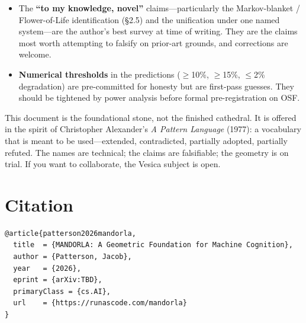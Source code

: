 \documentclass[11pt,a4paper]{article}
\begin{document}
\begin{itemize}[leftmargin=*]
  \item The \textbf{``to my knowledge, novel''} claims---particularly the Markov-blanket / Flower-of-Life identification (\S 2.5) and the unification under one named system---are the author's best survey at time of writing. They are the claims most worth attempting to falsify on prior-art grounds, and corrections are welcome.
  \item \textbf{Numerical thresholds} in the predictions ($\geq$10\%, $\geq$15\%, $\leq$2\% degradation) are pre-committed for honesty but are first-pass guesses. They should be tightened by power analysis before formal pre-registration on OSF.
\end{itemize}

This document is the foundational stone, not the finished cathedral. It is offered in the spirit of Christopher Alexander's \emph{A Pattern Language} (1977): a vocabulary that is meant to be used---extended, contradicted, partially adopted, partially refuted. The names are technical; the claims are falsifiable; the geometry is on trial. If you want to collaborate, the Vesica subject is open.

\section*{Citation}

\begin{verbatim}
@article{patterson2026mandorla,
  title  = {MANDORLA: A Geometric Foundation for Machine Cognition},
  author = {Patterson, Jacob},
  year   = {2026},
  eprint = {arXiv:TBD},
  primaryClass = {cs.AI},
  url    = {https://runascode.com/mandorla}
}
\end{verbatim}
\end{document}
